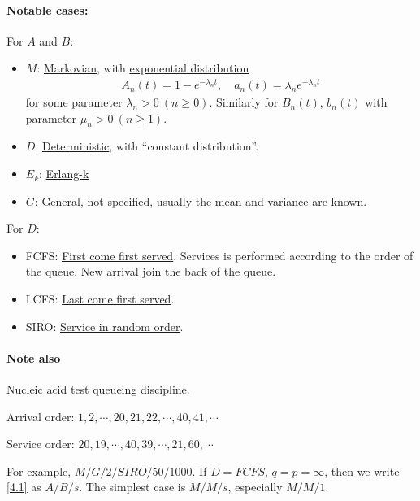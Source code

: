 \paragraph{Notable cases:}
For $A$ and $B$:
\begin{itemize}
    \item $M$: \uline{Markovian}, with \uline{exponential distribution}
    \begin{align*}
        A_n(t) = 1-e^{-\lambda_n t},\quad a_n(t) = \lambda_n e^{-\lambda_n t}
    \end{align*}
    for some parameter $\lambda_n > 0\ (n\geqslant 0)$. Similarly for $B_n(t)$, $b_n(t)$ with parameter $\mu_n>0\ (n\geqslant 1)$.
    \item $D$: \uline{Deterministic}, with ``constant distribution''.
    \item $E_k$: \uline{Erlang-k}
    \item $G$: \uline{General}, not specified, usually the mean and variance are known.
\end{itemize}

For $D$:
\begin{itemize}
    \item FCFS: \uline{First come first served}. Services is performed according to the order of the queue. New arrival join the back of the queue.
    \item LCFS: \uline{Last come first served}. 
    \item SIRO: \uline{Service in random order}.
\end{itemize}

\paragraph{Note also} Nucleic acid test queueing discipline. 

Arrival order: $1,2,\cdots, 20, 21, 22, \cdots, 40, 41, \cdots$

Service order: $20, 19, \cdots, 40, 39,\cdots, 21, 60, \cdots$

For example, $M/G/2/SIRO/50/1000$. If $D = FCFS$, $q=p=\infty$, then we write \ref{4.1} as $A/B/s$. The simplest case is $M/M/s$, especially $M/M/1$.

